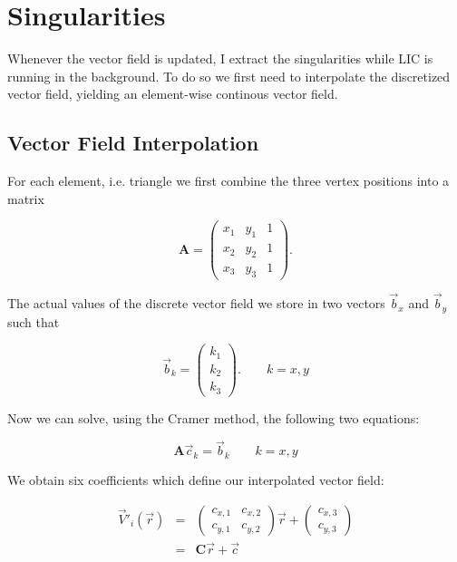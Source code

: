 \documentclass[a4paper,10pt,notitlepage]{scrreprt}
\newcommand{\mat}[1]{\mathbf{#1}}
\begin{document}
\section{Singularities}

Whenever the vector field is updated, I extract the singularities while LIC is
running in the background. To do so we first need to interpolate the discretized
vector field, yielding an element-wise continous vector field.

\subsection{Vector Field Interpolation}

For each element, i.e. triangle we first combine the three vertex positions
into a matrix

\begin{equation}
 \mat{A} = \left(
\begin{array}{ccc}
x_1 & y_1 & 1 \\
x_2 & y_2 & 1 \\
x_3 & y_3 & 1 \end{array} \right).
\end{equation}

The actual values of the discrete vector field we store in two vectors
$\vec{b}_x$ and $\vec{b}_y$ such that

\begin{equation}
 \vec{b}_{k} = \left( \begin{array}{c} k_1 \\ k_2 \\ k_3 \end{array} \right) .
\qquad k = x,y
\end{equation}

Now we can solve, using the Cramer method, the following two equations:

\begin{equation}
 \mat{A} \vec{c}_k = \vec{b}_k \qquad k = x,y
\end{equation}

We obtain six coefficients which define our interpolated vector field:

\begin{eqnarray}
 \vec{V}'_i(\vec{r}) &=& \left(
\begin{array}{cc}
c_{x,1} & c_{x,2} \\
c_{y,1} & c_{y,2} \end{array} \right) \vec{r} + \left( \begin{array}{c} c_{x,3}
\\ c_{y,3} \end{array} \right) \\
 &=& \mat{C} \vec{r} + \vec{c}
\label{eq:interpolated-field}
\end{eqnarray}
\end{document}
